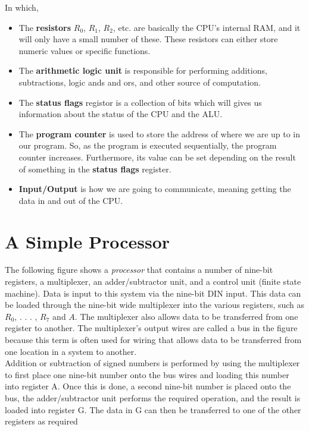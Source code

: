 In which,
\begin{itemize}
	\item The \textbf{resistors} $R_0$, $R_1$, $R_2$, etc. are basically the CPU's internal RAM, and it will only have a small number of these. These resistors can either store numeric values or specific functions.
	\item The \textbf{arithmetic logic unit} is responsible for performing additions, subtractions, logic ands and ors, and other source of computation.
	\item The \textbf{status flags} registor is a collection of bits which will gives us information about the status of the CPU and the ALU.
	\item The \textbf{program counter} is used to store the address of where we are up to in our program. So, as the program is executed sequentially, the program counter increases. Furthermore, its value can be set depending on the result of something in the \textbf{status flags} register.
	\item \textbf{Input/Output} is how we are going to communicate, meaning getting the data in and out of the CPU.
\end{itemize}

\section{A Simple Processor}
The following figure shows a \textit{processor} that contains a number of nine-bit registers, a multiplexer, an adder/subtractor unit, and a control unit (finite state machine). Data is input to this system via the nine-bit DIN input. This data can be loaded through the nine-bit wide multiplexer into the various registers, such as $R_0$, . . . , $R_7$ and $A$. The multiplexer also allows data to be transferred from one register to another. The multiplexer’s output wires are called a bus in the figure because this term is often used for wiring that allows data to be transferred from one location in a system to another.\bigskip\\
Addition or subtraction of signed numbers is performed by using the multiplexer to first place one nine-bit number onto the bus wires and loading this number into register A. Once this is done, a second nine-bit number is placed onto the bus, the adder/subtractor unit performs the required operation, and the result is loaded into register G. The data in G can then be transferred to one of the other registers as required\\

